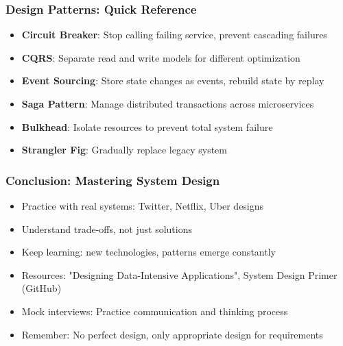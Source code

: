 \begin{frame}[fragile]\frametitle{Design Patterns: Quick Reference}

      \begin{itemize}
		\item \textbf{Circuit Breaker}: Stop calling failing service, prevent cascading failures
		\item \textbf{CQRS}: Separate read and write models for different optimization
		\item \textbf{Event Sourcing}: Store state changes as events, rebuild state by replay
		\item \textbf{Saga Pattern}: Manage distributed transactions across microservices
		\item \textbf{Bulkhead}: Isolate resources to prevent total system failure
		\item \textbf{Strangler Fig}: Gradually replace legacy system
	  \end{itemize}

\end{frame}

\begin{frame}[fragile]\frametitle{Conclusion: Mastering System Design}

      \begin{itemize}
		\item Practice with real systems: Twitter, Netflix, Uber designs
		\item Understand trade-offs, not just solutions
		\item Keep learning: new technologies, patterns emerge constantly
		\item Resources: "Designing Data-Intensive Applications", System Design Primer (GitHub)
		\item Mock interviews: Practice communication and thinking process
		\item Remember: No perfect design, only appropriate design for requirements
	  \end{itemize}

\end{frame}

